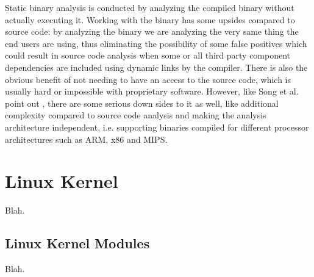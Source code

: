 Static binary analysis is conducted by analyzing the compiled binary without actually executing it.
Working with the binary has some upsides compared to source code: by analyzing the binary we are
analyzing the very same thing the end users are using, thus eliminating the possibility of some
false positives which could result in source code analysis when some or all third party component
dependencies are included using dynamic links by the compiler. There is also the obvious benefit of
not needing to have an access to the source code, which is usually hard or impossible with
proprietary software. However, like Song et al. point out \cite{song2008bitblaze}, there are some
serious down sides to it as well, like additional complexity compared to source code analysis and
making the analysis architecture independent, i.e. supporting binaries compiled for different
processor architectures such as ARM, x86 and MIPS.

\section{Linux Kernel}

Blah.

\subsection{Linux Kernel Modules}

Blah.
